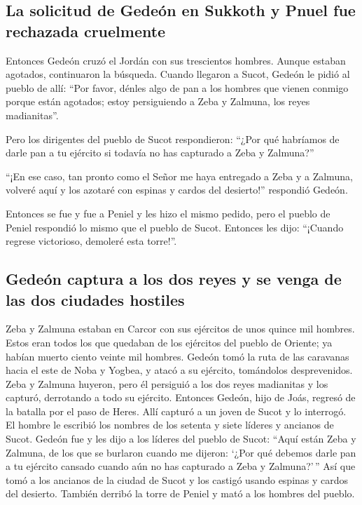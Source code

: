 \hypertarget{la-solicitud-de-gedeuxf3n-en-sukkoth-y-pnuel-fue-rechazada-cruelmente}{%
\subsection{La solicitud de Gedeón en Sukkoth y Pnuel fue rechazada
cruelmente}\label{la-solicitud-de-gedeuxf3n-en-sukkoth-y-pnuel-fue-rechazada-cruelmente}}

 Entonces Gedeón cruzó el Jordán con sus trescientos
hombres. Aunque estaban agotados, continuaron la búsqueda.
 Cuando llegaron a Sucot, Gedeón le pidió al pueblo de
allí: ``Por favor, dénles algo de pan a los hombres que vienen conmigo
porque están agotados; estoy persiguiendo a Zeba y Zalmuna, los reyes
madianitas''.

 Pero los dirigentes del pueblo de Sucot respondieron:
``¿Por qué habríamos de darle pan a tu ejército si todavía no has
capturado a Zeba y Zalmuna?''

 ``¡En ese caso, tan pronto como el Señor me haya
entregado a Zeba y a Zalmuna, volveré aquí y los azotaré con espinas y
cardos del desierto!'' respondió Gedeón.

 Entonces se fue y fue a Peniel y les hizo el mismo
pedido, pero el pueblo de Peniel respondió lo mismo que el pueblo de
Sucot.  Entonces les dijo: ``¡Cuando regrese victorioso,
demoleré esta torre!''.

\hypertarget{gedeuxf3n-captura-a-los-dos-reyes-y-se-venga-de-las-dos-ciudades-hostiles}{%
\subsection{Gedeón captura a los dos reyes y se venga de las dos
ciudades
hostiles}\label{gedeuxf3n-captura-a-los-dos-reyes-y-se-venga-de-las-dos-ciudades-hostiles}}

 Zeba y Zalmuna estaban en Carcor con sus ejércitos de
unos quince mil hombres. Estos eran todos los que quedaban de los
ejércitos del pueblo de Oriente; ya habían muerto ciento veinte mil
hombres.  Gedeón tomó la ruta de las caravanas hacia el
este de Noba y Yogbea, y atacó a su ejército, tomándolos desprevenidos.
 Zeba y Zalmuna huyeron, pero él persiguió a los dos
reyes madianitas y los capturó, derrotando a todo su ejército.
 Entonces Gedeón, hijo de Joás, regresó de la batalla por
el paso de Heres.  Allí capturó a un joven de Sucot y lo
interrogó. El hombre le escribió los nombres de los setenta y siete
líderes y ancianos de Sucot.  Gedeón fue y les dijo a los
líderes del pueblo de Sucot: ``Aquí están Zeba y Zalmuna, de los que se
burlaron cuando me dijeron: `¿Por qué debemos darle pan a tu ejército
cansado cuando aún no has capturado a Zeba y Zalmuna?'\,''
 Así que tomó a los ancianos de la ciudad de Sucot y los
castigó usando espinas y cardos del desierto.  También
derribó la torre de Peniel y mató a los hombres del pueblo.

